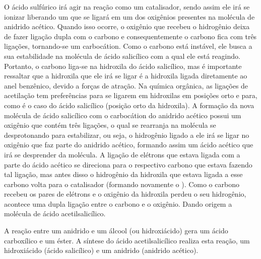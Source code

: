 O ácido sulfúrico irá agir na reação como um catalisador, sendo assim ele irá se ionizar liberando
um  que se ligará em um dos oxigênios presentes na molécula de anidrido acético. Quando isso
ocorre, o oxigênio que recebeu o hidrogênio deixa de fazer ligação dupla com o carbono e
consequentemente o carbono fica com três ligações, tornando-se um carbocátion. Como o carbono está
instável, ele busca a sua estabilidade na molécula de ácido salicílico com a qual ele está reagindo.
Portanto, o carbono liga-se na hidroxila do ácido salicílico, mas é importante ressaltar que a
hidroxila que ele irá se ligar é a hidroxila ligada diretamente ao anel benzênico, devido a forças
de atração. Na química orgânica, as ligações de acetilação tem preferências para se ligarem em
hidroxilas em posições orto e para, como é o caso do ácido salicílico (posição orto da hidroxila). A
formação da nova molécula de ácido salicílico com o carbocátion do anidrido acético possui um
oxigênio que contém três ligações, o qual se rearranja na molécula se desprotonando para
estabilizar, ou seja, o hidrogênio ligado a ele irá se ligar no oxigênio que faz parte do anidrido
acético, formando assim um ácido acético que irá se desprender da molécula. A ligação de elétrons
que estava ligada com a parte do ácido acético se direciona para o respectivo carbono que estava
fazendo tal ligação, mas antes disso o hidrogênio da hidroxila que estava ligada a esse carbono
volta para o catalisador (formando novamente o ). Como o carbono recebeu os pares de
elétrons e o oxigênio da hidroxila perdeu o seu hidrogênio, acontece uma dupla ligação entre o
carbono e o oxigênio. Dando origem a molécula de ácido acetilsalicílico.

A reação entre um anidrido e um álcool (ou hidroxiácido) gera um ácido carboxílico e um éster. A
síntese do ácido acetilsalicílico realiza esta reação, um hidroxiácido (ácido salicílico) e um
anidrido (anidrido acético).

\newpage

